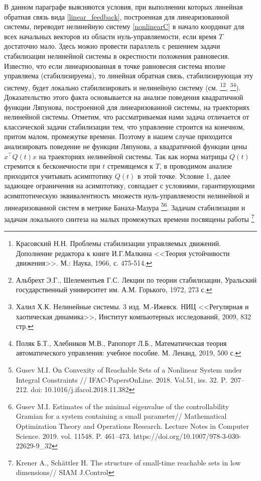 \documentclass[../main.tex]{subfiles}
\begin{document}
В данном параграфе выясняются условия, при выполнении которых линейная обратная связь  вида \eqref{linear_feedback}, построенная для линеаризованной системы, переводит нелинейную систему \eqref{nonlinearC} в начало координат для всех начальных векторов из области нуль-управляемости, если время $T$ достаточно мало. Здесь можно провести параллель с  решением задачи стабилизации  нелинейной системы в окрестности положения равновесия.   Известно, что если линеаризованная в точке равновесия система  вполне управляема (стабилизируема), то линейная обратная связь, стабилизирующая эту систему, будет локально стабилизировать  и нелинейную систему  (см. \footnote{Красовский Н.Н. Проблемы стабилизации управляемых движений. Дополнение редактора к книге И.Г.Малкина <<Теория устойчивости  движения>>. М.: Наука, 1966, с. 475-514.}\footnote{Альбрехт Э.Г., Шелементьев Г.С. Лекции по теории стабилизации, Уральский государственный университет им. А.М. Горького, 1972, 273 с.}, \footnote{Халил Х.К. Нелинейные системы. 3 изд. М.-Ижевск. НИЦ <<Регулярная и хаотическая динамика>>, Институт компьютерных исследований, 2009, 832 стр.}\footnote{Поляк Б.Т., Хлебников М.В., Рапопорт Л.Б., Математическая теория автоматического управления: учебное пособие. М. Ленанд, 2019, 500 с.}). Доказательство этого факта основывается на анализе поведения квадратичной функции Ляпунова, построенной для линеаризованной системы, на траекториях нелинейной системы. Отметим, что рассматриваемая нами задача отличается от классической задачи стабилизации тем, что управление строится на конечном, притом малом, промежутке времени. Поэтому в нашем случае приходится анализировать поведение не функции Ляпунова, а квадратичной функции цены  $x^\top Q(t)x$ на траекториях нелинейной системы.  Так как норма матрицы $Q(t)$ стремится к бесконечности при $t$ стремящемся к $T$, в проводимом анализе приходится учитывать асимптотику $Q(t)$ в этой точке.  Условие 1, далее задающее ограничения на асимптотику, совпадает с условиями, гарантирующими асимптотическую эквивалентность множеств нуль-управляемости нелинейной и линеаризованной систем в метрике Банаха-Мазура  \footnote{Gusev M.I. On Convexity of Reachable Sets of a Nonlinear System under Integral Constraints // IFAC-PapersOnLine. 2018. Vol.51, iss. 32. P.~207--212. doi: 10.1016/j.ifacol.2018.11.382}\footnote{Gusev M.I. Estimates of the minimal eigenvalue of the controllability Gramian for a system containing a small parameter//  Mathematical Optimization Theory and Operations Research. Lecture Notes in Computer Science. 2019. vol. 11548. P. 461--473.  https://doi.org/10.1007/978-3-030-22629-9\_32}. Задачам стабилизации и задачам локального синтеза на малых промежутках времени посвящены работы \footnote{Krener A., Sch\"{a}ttler H. The structure of small-time reachable sets in low dimensions// SIAM J.Control
}
\end{document}
